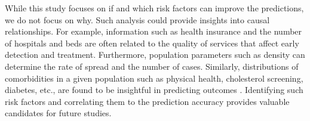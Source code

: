 \documentclass[12pt]{article}
\theoremstyle{definition}
\renewcommand{\_}{%
    \textunderscore\hspace{0pt}%
}
\begin{document}

While this study focuses on if and which risk factors can improve the predictions, we do not focus on why. Such analysis could provide insights into causal relationships. For example,  information such as health insurance and the number of hospitals and beds are often related to the quality of services that affect early detection and treatment. Furthermore, population parameters such as density can determine the rate of spread and the number of cases. Similarly, distributions of comorbidities in a given population such as physical health, cholesterol screening, diabetes, etc., are found to be insightful in predicting outcomes \cite{Maleki}. Identifying such risk factors and correlating them to the prediction accuracy provides valuable candidates for future studies.
\end{document}
